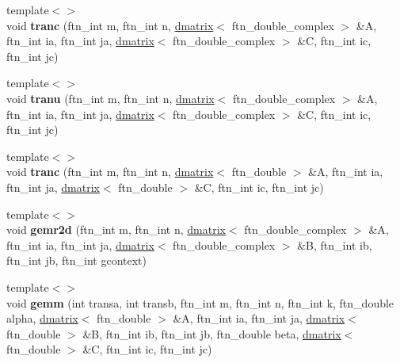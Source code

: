\begin{DoxyCompactItemize}
\item 
\hypertarget{classsddk_1_1linalg_3_01_c_p_u_01_4_a6c2848f4e6a603bd4e45873ff617b355}{}{\footnotesize template$<$$>$ }\\void {\bfseries tranc} (ftn\+\_\+int m, ftn\+\_\+int n, \hyperlink{classsddk_1_1dmatrix}{dmatrix}$<$ ftn\+\_\+double\+\_\+complex $>$ \&A, ftn\+\_\+int ia, ftn\+\_\+int ja, \hyperlink{classsddk_1_1dmatrix}{dmatrix}$<$ ftn\+\_\+double\+\_\+complex $>$ \&C, ftn\+\_\+int ic, ftn\+\_\+int jc)\label{classsddk_1_1linalg_3_01_c_p_u_01_4_a6c2848f4e6a603bd4e45873ff617b355}

\item 
\hypertarget{classsddk_1_1linalg_3_01_c_p_u_01_4_a26688d8f7dfe1b23b21e523c551e7b1a}{}{\footnotesize template$<$$>$ }\\void {\bfseries tranu} (ftn\+\_\+int m, ftn\+\_\+int n, \hyperlink{classsddk_1_1dmatrix}{dmatrix}$<$ ftn\+\_\+double\+\_\+complex $>$ \&A, ftn\+\_\+int ia, ftn\+\_\+int ja, \hyperlink{classsddk_1_1dmatrix}{dmatrix}$<$ ftn\+\_\+double\+\_\+complex $>$ \&C, ftn\+\_\+int ic, ftn\+\_\+int jc)\label{classsddk_1_1linalg_3_01_c_p_u_01_4_a26688d8f7dfe1b23b21e523c551e7b1a}

\item 
\hypertarget{classsddk_1_1linalg_3_01_c_p_u_01_4_a09596cd679528aeb42a3c912ec2d133f}{}{\footnotesize template$<$$>$ }\\void {\bfseries tranc} (ftn\+\_\+int m, ftn\+\_\+int n, \hyperlink{classsddk_1_1dmatrix}{dmatrix}$<$ ftn\+\_\+double $>$ \&A, ftn\+\_\+int ia, ftn\+\_\+int ja, \hyperlink{classsddk_1_1dmatrix}{dmatrix}$<$ ftn\+\_\+double $>$ \&C, ftn\+\_\+int ic, ftn\+\_\+int jc)\label{classsddk_1_1linalg_3_01_c_p_u_01_4_a09596cd679528aeb42a3c912ec2d133f}

\item 
\hypertarget{classsddk_1_1linalg_3_01_c_p_u_01_4_a9d63c024ca181471060aaecf95d46e1e}{}{\footnotesize template$<$$>$ }\\void {\bfseries gemr2d} (ftn\+\_\+int m, ftn\+\_\+int n, \hyperlink{classsddk_1_1dmatrix}{dmatrix}$<$ ftn\+\_\+double\+\_\+complex $>$ \&A, ftn\+\_\+int ia, ftn\+\_\+int ja, \hyperlink{classsddk_1_1dmatrix}{dmatrix}$<$ ftn\+\_\+double\+\_\+complex $>$ \&B, ftn\+\_\+int ib, ftn\+\_\+int jb, ftn\+\_\+int gcontext)\label{classsddk_1_1linalg_3_01_c_p_u_01_4_a9d63c024ca181471060aaecf95d46e1e}

\item 
\hypertarget{classsddk_1_1linalg_3_01_c_p_u_01_4_ab039b86b839afcd397881c32eda65d2a}{}{\footnotesize template$<$$>$ }\\void {\bfseries gemm} (int transa, int transb, ftn\+\_\+int m, ftn\+\_\+int n, ftn\+\_\+int k, ftn\+\_\+double alpha, \hyperlink{classsddk_1_1dmatrix}{dmatrix}$<$ ftn\+\_\+double $>$ \&A, ftn\+\_\+int ia, ftn\+\_\+int ja, \hyperlink{classsddk_1_1dmatrix}{dmatrix}$<$ ftn\+\_\+double $>$ \&B, ftn\+\_\+int ib, ftn\+\_\+int jb, ftn\+\_\+double beta, \hyperlink{classsddk_1_1dmatrix}{dmatrix}$<$ ftn\+\_\+double $>$ \&C, ftn\+\_\+int ic, ftn\+\_\+int jc)\label{classsddk_1_1linalg_3_01_c_p_u_01_4_ab039b86b839afcd397881c32eda65d2a}


\end{DoxyCompactItemize}
